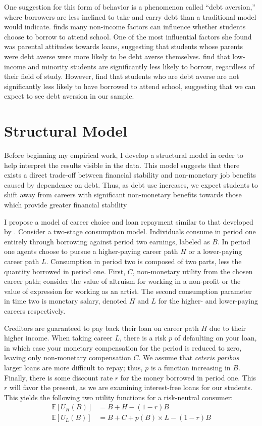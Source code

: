 \documentclass[12pt]{article}
\begin{document}
	One suggestion for this form of behavior is a phenomenon called ``debt aversion,'' where borrowers are less inclined to take and carry debt than a traditional model would indicate. \textcite{burdman2005} finds many non-income factors can influence whether students choose to borrow to attend school. One of the most influential factors she found was parental attitudes towards loans, suggesting that students whose parents were debt averse were more likely to be debt averse themselves. \textcite{callender2005} find that low-income and minority students are significantly less likely to borrow, regardless of their field of study. However, \textcite{eckel2007} find that students who are debt averse are not significantly less likely to have borrowed to attend school, suggesting that we can expect to see debt aversion in our sample. 

	\section{Structural Model}
	
	Before beginning my empirical work, I develop a structural model in order to help interpret the results visible in the data. This model suggests that there exists a direct trade-off between financial stability and non-monetary job benefits caused by dependence on debt. Thus, as debt use increases, we expect students to shift away from careers with significant non-monetary benefits towards those which provide greater financial stability

	I propose a model of career choice and loan repayment similar to that developed by \textcite{abraham2018}. Consider a two-stage consumption model. Individuals consume in period one entirely through borrowing against period two earnings, labeled as $B$. In period one agents choose to pursue a higher-paying career path $H$ or a lower-paying career path $L$. Consumption in period two is composed of two parts, less the quantity borrowed in period one. First, $C$, non-monetary utility from the chosen career path; consider the value of altruism for working in a non-profit or the value of expression for working as an artist. The second consumption parameter in time two is monetary salary, denoted $H$ and $L$ for the higher- and lower-paying careers respectively.
	
	Creditors are guaranteed to pay back their loan on career path $H$ due to their higher income. When taking career $L$, there is a risk $p$ of defaulting on your loan, in which case your monetary compensation for the period is reduced to zero, leaving only non-monetary compensation $C$. We assume that \emph{ceteris paribus} larger loans are more difficult to repay; thus, $p$ is a function increasing in $B$. Finally, there is some discount rate $r$ for the money borrowed in period one. This $r$ will favor the present, as we are examining interest-free loans for our students. This yields the following two utility functions for a risk-neutral consumer: 
	\begin{align}
	\mathbb{E}\left[U_H(B)\right] &= B + H - (1 - r)B \label{highu}\\
	\mathbb{E}\left[U_L(B)\right] &= B + C + p(B) \times L - (1 - r)B \label{lowu}
	\end{align}
	
\end{document}
